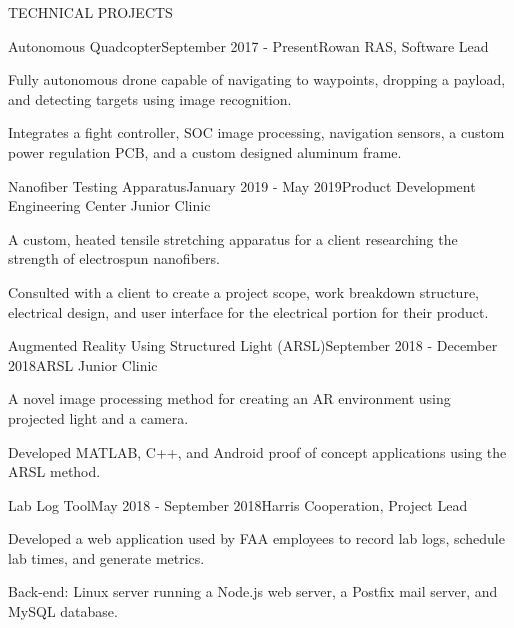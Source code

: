 \documentclass{resume} %
\begin{document}
\begin{rSection}{TECHNICAL PROJECTS}

  \begin{rSubsection}{Autonomous Quadcopter}{September 2017 - Present}{Rowan
      RAS, Software Lead}{}
  \item Fully autonomous drone capable of navigating to waypoints, dropping a
    payload, and detecting targets using image recognition.
  \item Integrates a fight controller, SOC image processing, navigation sensors,
    a custom power regulation PCB, and a custom designed aluminum frame.
  \end{rSubsection}


  \begin{rSubsection}{Nanofiber Testing Apparatus}{January 2019 - May 2019}{Product Development Engineering Center Junior Clinic}{}
  \item A custom, heated tensile stretching apparatus for a client researching the strength of electrospun nanofibers.
  \item Consulted with a client to create a project scope, work breakdown
    structure, electrical design, and user interface for the electrical portion
    for their product.
  \end{rSubsection}


  \begin{rSubsection}{Augmented Reality Using Structured Light (ARSL)}{September
      2018 - December 2018}{ARSL Junior Clinic}{}
  \item A novel image processing method for creating an AR environment using projected light and a camera.
  \item Developed MATLAB, C++, and Android proof of concept applications using the
    ARSL method.
  \end{rSubsection}


  \begin{rSubsection}{Lab Log Tool}{May 2018 - September 2018}{Harris Cooperation, Project Lead}{}
  \item Developed a web application used by FAA employees to record lab logs, schedule lab times, and generate metrics.
  \item Back-end: Linux server running a Node.js web server, a Postfix mail server, and MySQL database.
  \end{rSubsection}


\end{rSection}
\end{document}
